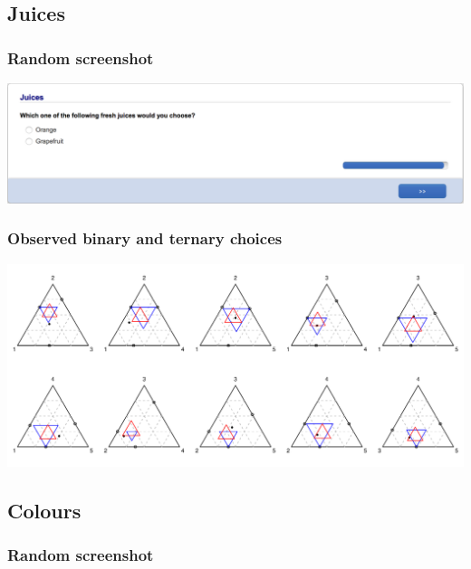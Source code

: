 \documentclass[11pt,letter]{article}
\begin{document}
\pagebreak

\subsection*{Juices}



\subsubsection*{Random screenshot}

\includegraphics[width=15cm]{Population_study_design/screenshot_Juices.png}

\subsubsection*{Observed binary and ternary choices}

\includegraphics[width=15cm]{./Population_study_data/Simplexes/Juices.pdf}

\pagebreak

\subsection*{Colours}



\subsubsection*{Random screenshot}
\end{document}
